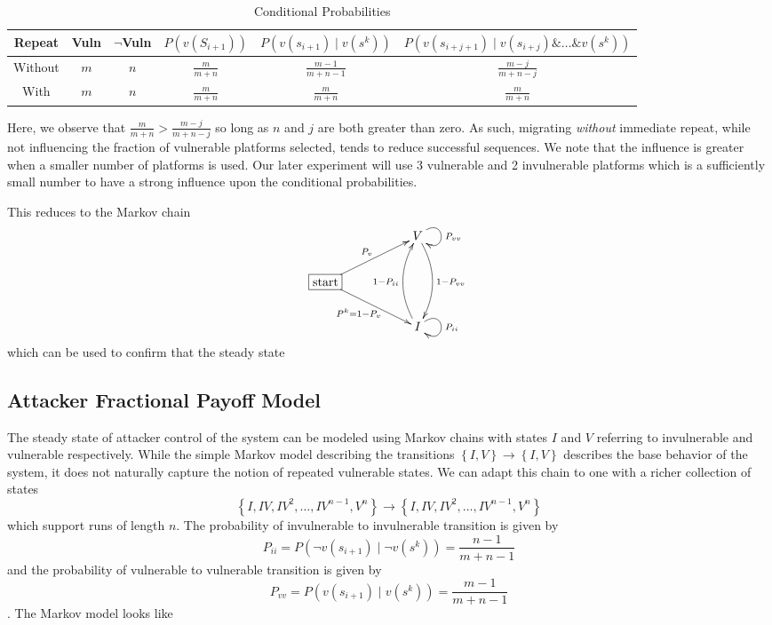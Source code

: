 \documentclass{acm_proc_article-sp}
\providecommand{\tabularnewline}{\\}
\begin{document}
\begin{table*}[t]
\centering{}\begin{tabular}{|c|c|c|c|c|c|}
\hline 
Repeat & {\footnotesize $\!\!$Vuln$\!\!$} & {\footnotesize $\!\!$$\neg$Vuln$\!\!$} & {\footnotesize $\!\! P\left(v\left(S_{i+1}\right)\right)\!\!$} & {\footnotesize $\!\! P\left(v\left(s_{i+1}\right)\!\mid\! v\left(s^{k}\right)\right)\!\!$} & {\footnotesize $\!\! P\left(v\left(s_{i+j+1}\right)\!\mid\! v\left(s_{i+j}\right)\&\ldots\&v\left(s^{k}\right)\right)\!\!$}\tabularnewline
\hline 
\hline 
Without & $m$ & $n$ & $\frac{m}{m+n}$ & $\frac{m-1}{m+n-1}$ & $\frac{m-j}{m+n-j}$\tabularnewline
\hline 
With & $m$ & $n$ & $\frac{m}{m+n}$ & $\frac{m}{m+n}$ & $\frac{m}{m+n}$\tabularnewline
\hline 
\end{tabular}\caption{Conditional Probabilities}
\label{TableConditionalProbabilities}
\end{table*}
Here, we observe that $\frac{m}{m+n}>\frac{m-j}{m+n-j}$ so long as
$n$ and $j$ are both greater than zero. As such, migrating \emph{without} immediate
repeat, while not influencing the fraction of vulnerable platforms
selected, tends to reduce successful sequences. We note that the influence is
greater when a smaller number of platforms is used. Our later experiment will
use 3 vulnerable and 2 invulnerable platforms which is a sufficiently
small number to have a strong influence upon the conditional probabilities.

This reduces to the Markov chain
\[
\xymatrix{ &  & V\ar@(ru,rd)[]^{P_{vv}}\ar@/^{1pc}/[dd]^{1-P_{vv}}\\
*+[F-]{\text{start}}\ar[rru]^{P_{v}}\ar[rrd]_{P^{k}=1-P_{v}}\\
 &  & I\ar@(ru,rd)[]^{P_{ii}}\ar@/^{1pc}/[uu]^{1-P_{ii}}
}
\]
which can be used to confirm that the steady state 


\subsection{Attacker Fractional Payoff Model}

The steady state of attacker control of the system can be modeled
using Markov chains with states $I$ and $V$ referring to invulnerable and vulnerable respectively. While the simple Markov model describing the
transitions $\left\{ I,V\right\} \longrightarrow\left\{ I,V\right\}$ describes
the base behavior of the system, it does not naturally capture the
notion of repeated vulnerable states. We can adapt this chain to one
with a richer collection of states 
{\small
\[
\left\{ I,IV,IV^{2},\ldots,IV^{n-1},V^{n}\right\} \longrightarrow\left\{ I,IV,IV^{2},\ldots,IV^{n-1},V^{n}\right\} 
\]
}
which support runs of length $n$. The probability of invulnerable
to invulnerable transition is given by 
\[
P_{ii}=P\left(\neg v\left(s_{i+1}\right)\!\mid\!\neg v\left(s^{k}\right)\right)=\frac{n-1}{m+n-1}
\]
 and the probability of vulnerable to vulnerable transition is given
by
\[
P_{vv}=P\left(v\left(s_{i+1}\right)\!\mid\! v\left(s^{k}\right)\right)=\frac{m-1}{m+n-1}
\].
The Markov model looks like
\end{document}

